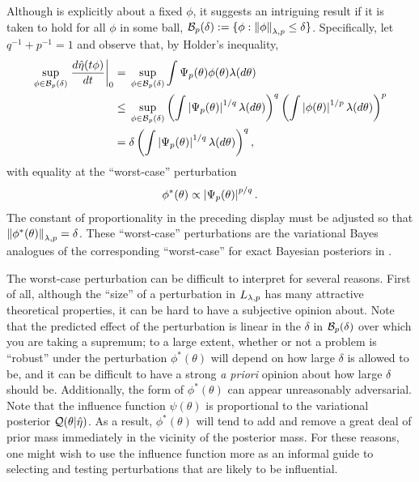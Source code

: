 
Although  is explicitly about a fixed $\phi$,
it suggests an intriguing result if it is taken to hold for all $\phi$ in some
ball, $\mathcal{B}_p(\delta) := \{\phi: \left\Vert\phi\right\Vert_{\lambda,p} \le \delta \}$.
Specifically, let $q^{-1} + p^{-1} = 1$ and observe that, by Holder's inequality,
%
\begin{align*}
%
\sup_{\phi \in \ball_p(\delta)} \fracat{d \etaopt(\t \phi)}{d \t}{0} ={}&
    \sup_{\phi \in \ball_p(\delta)}
        \int \infl_p(\theta) \phi(\theta) \lambda(d\theta)
\\\le{}&
    \sup_{\phi \in \ball_p(\delta)}
        \left( \int \abs{\infl_p(\theta)}^{1/q} \lambda(d\theta) \right)^q
        \left( \int \abs{\phi(\theta)}^{1/p} \lambda(d\theta)\right)^p
\\={}&
\delta \left( \int \abs{\infl_p(\theta)}^{1/q} \lambda(d\theta) \right)^q,
%
\end{align*}
%
with equality at the ``worst-case'' perturbation
%
\begin{align*}
%
\phi^*(\theta) \propto \abs{\infl_p(\theta)}^{p/q}.
%
\end{align*}
%
The constant of proportionality in the preceding display must be adjusted so
that $\left\Vert\phi^*(\theta)\right\Vert_{\lambda,p} = \delta$.  These ``worst-case''
perturbations are the variational Bayes analogues of the corresponding
``worst-case'' for exact Bayesian posteriors in \citet{gustafson:1996:local}.

The worst-case perturbation can be difficult to interpret for several reasons.
First of all, although the ``size'' of a perturbation in ${L_{\lambda,p}}$ has
many attractive theoretical properties, it can be hard to have a subjective
opinion about.  Note that the predicted effect of the perturbation is linear in
the $\delta$ in $\mathcal{B}_p(\delta)$ over which you are taking a supremum; to a
large extent, whether or not a problem is ``robust'' under the perturbation
$\phi^*(\theta)$ will depend on how large $\delta$ is allowed to be, and it can
be difficult to have a strong {\em a priori} opinion about how large $\delta$
should be.  Additionally, the form of $\phi^*(\theta)$ can appear unreasonably
adversarial. Note that the influence function $\psi(\theta)$ is proportional to
the variational posterior $\mathcal{Q}(\theta \vert \hat\eta)$.  As a result,
$\phi^*(\theta)$ will tend to add and remove a great deal of prior mass
immediately in the vicinity of the posterior mass.  For these reasons,
one might wish to use the influence function more as an informal guide to
selecting and testing perturbations that are likely to be influential.

